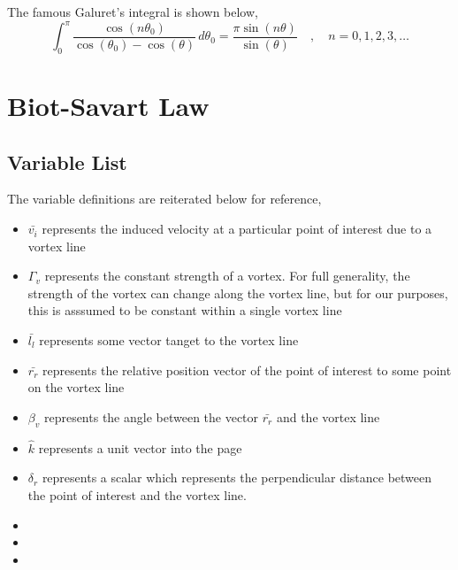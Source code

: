 \documentclass[a4paper, 12pt]{report}
\begin{document}
\tableofcontents

\begin{center}



The famous Galuret's integral is shown below,
\begin{equation}
\int^{\pi}_{0} \frac{\cos(n\theta_{0})}{\cos(\theta_{0}) - \cos(\theta)} \,d\theta_{0} = \frac{\pi \sin(n\theta)}{\sin(\theta)} \quad,\quad n = 0,1,2,3,\dots
\label{Galuret's Integral}
\end{equation}


\section{Biot-Savart Law}
\begin{comment}
\end{comment}

\subsection{Variable List}
\begin{comment}
\end{comment}
The variable definitions are reiterated below for reference,
\begin{itemize}
\item $\bar{v_{i}}$ represents the induced velocity at a particular point of interest due to a vortex line
\item $\Gamma_{v}$ represents the constant strength of a vortex. For full generality, the strength of the vortex can change along the vortex line, but for our purposes, this is asssumed to be constant within a single vortex line
\item $\bar{l_{l}}$ represents some vector tanget to the vortex line
\item $\bar{r_{r}}$ represents the relative position vector of the point of interest to some point on the vortex line
\item $\beta_{v}$ represents the angle between the vector $\bar{r_{r}}$ and the vortex line
\item $\hat{k}$ represents a unit vector into the page
\item $\delta_{r}$ represents a scalar which represents the perpendicular distance between the point of interest and the vortex line.
\item 
\item 
\item 
\end{itemize}


\end{center}
\end{document}
